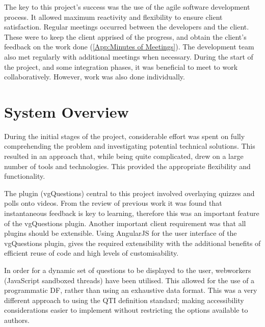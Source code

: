 The key to this project's success was the use of the agile software development
process. It allowed maximum reactivity and flexibility to ensure client
satisfaction. Regular meetings occurred between the developers and the client. These were
to keep the client apprised of the progress, and obtain the client's feedback on the
work done (\cref{App:Minutes of Meetings}). The development team also met regularly with additional meetings when necessary. During the start of the project, and some integration phases, it was beneficial to meet to work collaboratively. However, work was also done individually.




\section{System Overview}


During the initial stages of the project, considerable effort was spent on fully comprehending the problem and investigating potential technical solutions. This resulted in an approach that, while being quite complicated, drew on a large number of tools and technologies. This provided the appropriate flexibility and functionality. 

The plugin (\gls{vgQuestions}) central to this project involved overlaying quizzes and polls onto videos. From the review of previous work it was found that instantaneous feedback is key to learning, therefore this was an important feature of the \gls{vgQuestions} plugin. Another important client requirement was that all plugins should be extensible. Using \gls{AngularJS} for the user interface of the \gls{vgQuestions} plugin, gives the required extensibility with the additional benefits of efficient reuse of code and high levels of customisability. 

In order for a dynamic set of questions to be displayed to the user, \glspl{webworker} (JavaScript sandboxed threads) have been utilised. This allowed for the use of a programmatic \gls{DF}, rather than using an exhaustive data format. This was a very different approach to using the \gls{QTI} definition standard; making accessibility considerations easier to implement without restricting the options available to authors.

